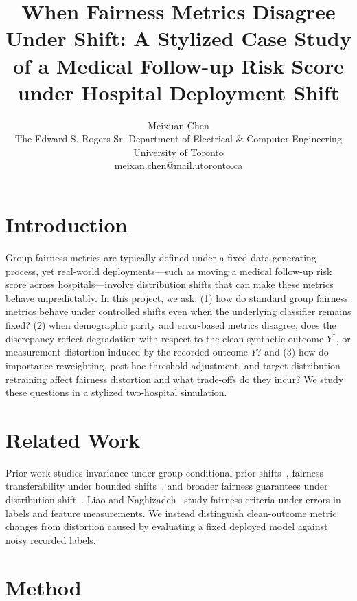 \documentclass[11pt, letterpaper]{article}
\begin{document}
\title{When Fairness Metrics Disagree Under Shift: A Stylized Case Study of a Medical Follow-up Risk Score under Hospital Deployment Shift}
\author{Meixuan Chen \\ The Edward S. Rogers Sr. Department of Electrical \& Computer Engineering \\ University of Toronto \\meixan.chen@mail.utoronto.ca}
\date{}
\maketitle


\section{Introduction}

Group fairness metrics are typically defined under a fixed data-generating process, yet real-world deployments---such as moving a medical follow-up risk score across hospitals---involve distribution shifts that can make these metrics behave unpredictably. In this project, we ask: (1) how do standard group fairness metrics behave under controlled shifts even when the underlying classifier remains fixed? (2) when demographic parity and error-based metrics disagree, does the discrepancy reflect degradation with respect to the clean synthetic outcome $Y^*$, or measurement distortion induced by the recorded outcome $\tilde{Y}$? and (3) how do importance reweighting, post-hoc threshold adjustment, and target-distribution retraining affect fairness distortion and what trade-offs do they incur? We study these questions in a stylized two-hospital simulation.

\section{Related Work}
Prior work studies invariance under group-conditional prior shifts~\cite{asiaee2026fairness}, fairness transferability under bounded shifts~\cite{chen2022fairness}, and broader fairness guarantees under distribution shift~\cite{barrainkua2022survey,shao2024supervised}. Liao and Naghizadeh~\cite{liao2022social} study fairness criteria under errors in labels and feature measurements. We instead distinguish clean-outcome metric changes from distortion caused by evaluating a fixed deployed model against noisy recorded labels.

\section{Method}
\end{document}
